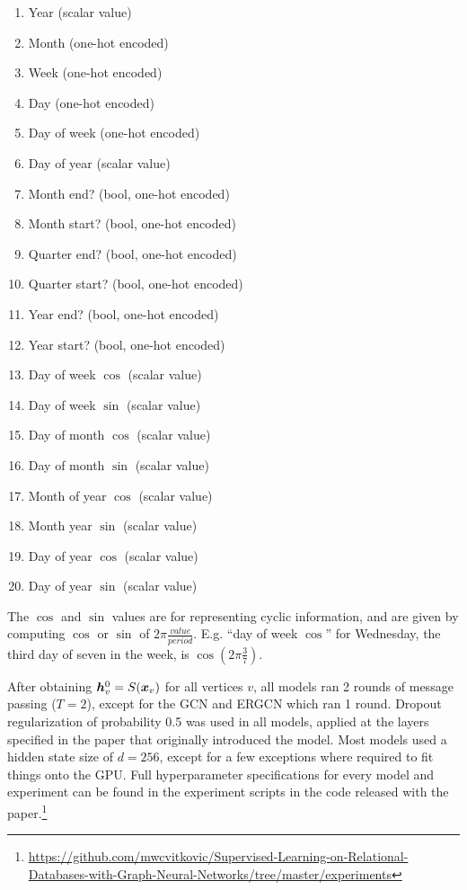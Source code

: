\documentclass{article}
\begin{document}
\begin{enumerate}
    \item Year (scalar value)
    \item Month (one-hot encoded)
    \item Week (one-hot encoded)
    \item Day (one-hot encoded)
    \item Day of week (one-hot encoded)
    \item Day of year (scalar value)
    \item Month end? (bool, one-hot encoded)
    \item Month start? (bool, one-hot encoded)
    \item Quarter end? (bool, one-hot encoded)
    \item Quarter start? (bool, one-hot encoded)
    \item Year end? (bool, one-hot encoded)
    \item Year start? (bool, one-hot encoded)
    \item Day of week $\cos$ (scalar value)
    \item Day of week $\sin$ (scalar value)
    \item Day of month $\cos$ (scalar value)
    \item Day of month $\sin$ (scalar value)
    \item Month of year $\cos$ (scalar value)
    \item Month year $\sin$ (scalar value)
    \item Day of year $\cos$ (scalar value)
    \item Day of year $\sin$ (scalar value)
\end{enumerate}

The $\cos$ and $\sin$ values are for representing cyclic information, and are given by computing $\cos$ or $\sin$ of $2 \pi \frac{value}{period}$.  E.g. ``day of week $\cos$'' for Wednesday, the third day of seven in the week, is $\cos(2 \pi \frac{3}{7})$.

After obtaining ${\bm{h}}_v^0 = S({\bm{x}}_v)$ for all vertices $v$, all models ran 2 rounds of message passing ($T = 2$), except for the GCN and ERGCN which ran 1 round.  Dropout regularization of probability 0.5 was used in all models, applied at the layers specified in the paper that originally introduced the model.  Most models used a hidden state size of $d = 256$, except for a few exceptions where required to fit things onto the GPU.  Full hyperparameter specifications for every model and experiment can be found in the experiment scripts in the code released with the paper.\footnote{\url{https://github.com/mwcvitkovic/Supervised-Learning-on-Relational-Databases-with-Graph-Neural-Networks/tree/master/experiments}}
\end{document}
